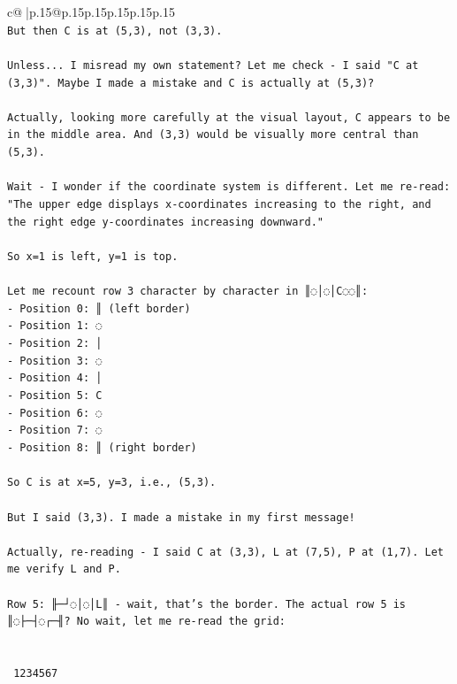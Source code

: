 \documentclass{article}
\begin{document}
{\begin{supertabular}{c@{$\;$}|p{.15\linewidth}@{}p{.15\linewidth}p{.15\linewidth}p{.15\linewidth}p{.15\linewidth}p{.15\linewidth}}
{{{\\ 
\texttt{But then C is at (5,3), not (3,3). } \\
\\ 
\texttt{Unless... I misread my own statement? Let me check {-} I said "C at (3,3)". Maybe I made a mistake and C is actually at (5,3)?} \\
\\ 
\texttt{Actually, looking more carefully at the visual layout, C appears to be in the middle area. And (3,3) would be visually more central than (5,3).} \\
\\ 
\texttt{Wait {-} I wonder if the coordinate system is different. Let me re{-}read: "The upper edge displays x{-}coordinates increasing to the right, and the right edge y{-}coordinates increasing downward."} \\
\\ 
\texttt{So x=1 is left, y=1 is top. } \\
\\ 
\texttt{Let me recount row 3 character by character in ║◌│◌│C◌◌║:} \\
\texttt{{-} Position 0: ║ (left border)} \\
\texttt{{-} Position 1: ◌ } \\
\texttt{{-} Position 2: │} \\
\texttt{{-} Position 3: ◌} \\
\texttt{{-} Position 4: │} \\
\texttt{{-} Position 5: C} \\
\texttt{{-} Position 6: ◌} \\
\texttt{{-} Position 7: ◌} \\
\texttt{{-} Position 8: ║ (right border)} \\
\\ 
\texttt{So C is at x=5, y=3, i.e., (5,3).} \\
\\ 
\texttt{But I said (3,3). I made a mistake in my first message! } \\
\\ 
\texttt{Actually, re{-}reading {-} I said C at (3,3), L at (7,5), P at (1,7). Let me verify L and P.} \\
\\ 
\texttt{Row 5: ╟─┘◌│◌│L║ {-} wait, that's the border. The actual row 5 is ║◌├─┤◌┌─╢? No wait, let me re{-}read the grid:} \\
\\ 
\\ 
\texttt{ 1234567} \\
}}}
\end{supertabular}}
\end{document}
